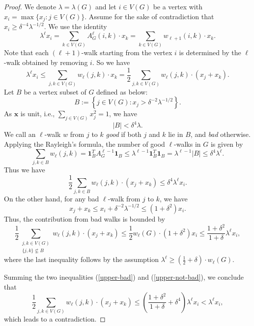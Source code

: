 \documentclass[11pt,a4paper]{article}
\theoremstyle{definition}
\theoremstyle{remark}
\newcommand*{\abs}[1]{\lvert#1\rvert}
\begin{document}
\begin{proof}
We denote  $\lambda = \lambda(G)$ and let $i \in V(G)$ be a vertex with $x_i = \max\{x_j : j\in V(G)\}$. 
Assume for the sake of contradiction that 
$x_i \ge \delta^{-4}\lambda^{-1/2}$. We use the identity
$$\lambda^{\ell} x_i = \sum_{k \in V(G)} A_G^{\ell}(i,k) \cdot x_k = 
 \sum_{k \in V(G)} w_{\ell + 1}(i, k) \cdot x_k.$$ 
Note that each $(\ell +1)$-walk starting from the vertex $i$ 
is determined by the $\ell$-walk obtained by removing $i$. So we have
$$\lambda^{\ell} x_i \leq \sum_{j, k \in V(G)} w_\ell(j, k) \cdot x_k = \frac{1}{2} 
\sum_{j, k \in V(G)} w_\ell(j, k)\cdot  (x_j + x_k).$$
Let $B$ be a vertex subset of $G$ defined as below: 
\[ B := \left\{j\in V(G):  x_j > 
\delta^{-2} \lambda^{-1/2} \right\}. \] 
As $\bm{x}$ is unit, i.e., $\sum_{j\in V(G)} x_j^2 = 1$, we have 
\[ \abs{B} < \delta^4 \lambda.\] 
We call an $\ell$-walk $w$ from $j$ to $k$ \emph{good} if both $j$ and $k$ lie in $B$, and \emph{bad} otherwise.
Applying the Rayleigh's formula, the number of good $\ell$-walks in $G$ is given by
$$\sum_{j, k \in B} w_\ell(j, k) = \mathbf{1}_{B}^T A_G^{\ell - 1}  \mathbf{1}_{B} \leq \lambda^{\ell - 1} \mathbf{1}_{B}^T \mathbf{1}_{B} = \lambda^{\ell - 1} |B| \leq \delta^4 \lambda^{\ell}.$$
Thus we have
\begin{equation} \label{upper-bad}
    \frac{1}{2} \sum_{j, k \in B} w_\ell(j, k) \cdot (x_j + x_k) \leq \delta^4 \lambda^{\ell} x_i.
\end{equation}
On the other hand, for any bad $\ell$-walk from $j$ to $k$, we have 
\[ x_j+x_k\le x_i+\delta^{-2}\lambda^{-1/2}\le(1+\delta^2)x_i. \]
Thus, the contribution from bad walks is bounded by 
\begin{equation} \label{upper-not-bad}
    \frac{1}{2}
\sum_{\substack{j, k \in V(G)\\ \{j, k\} \not\subseteq B}} w_\ell(j, k) \cdot (x_j + x_k) \leq \frac{1}{2} w_{\ell}(G) \cdot (1 + \delta^2) x_i \leq \frac{1 + \delta^2}{1 + \delta} \lambda^{\ell} x_i,
\end{equation}
where the last inequality follows by the assumption  $\lambda^{\ell}\ge \left(\frac{1}{2} + \delta\right) \cdot w_{\ell}(G)$. 

Summing the two inequalities (\ref{upper-bad}) and (\ref{upper-not-bad}), we conclude that
$$\frac{1}{2}\sum_{j, k \in V(G)} w_\ell(j, k) \cdot (x_j + x_k) \leq \left(\frac{1 + \delta^2}{1 + \delta} + \delta^4\right) \lambda^{\ell} x_i < \lambda^{\ell} x_i,$$
which leads to a contradiction.
\end{proof}
\end{document}
